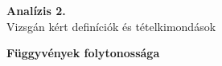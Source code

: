 \documentclass[a4paper,11pt]{article}
\begin{document}
\def\Z{\mathbb{Z}}
\def\R{\mathbb{R}}
\def\N{\mathbb{N}}
\def\Q{\mathbb{Q}}
\def\Ra{\overline{\mathbb{R}}}
\def\sume{\displaystyle\sum_{n=1}^{+\infty}}
\def\sumn{\displaystyle\sum_{n=0}^{+\infty}}
\def\sumun{\displaystyle\sum_{n=0}}
\def\limn{\displaystyle\lim_{n\to +\infty}}
\def\limh{\displaystyle\lim_{h\to0}}
\def\limxa{\displaystyle\lim_{x\to a}}
\def\limxatelj{\displaystyle\lim_{x\to a}\frac{f(x)-f(a)}{x-a}}
\def\rtr{\displaystyle\R\to\R}
\def\D{\mathcal{D}}
\def\lima{\displaystyle\lim_{a}}
\def\fda{f\in\D(a)}
\def\cab{\in C[a,b]}
\def\dab{\in\D(a,b)}
\def\limaj{\displaystyle\lim_{a+0}}
\def\Rv{\overline{\mathbb{R}}}
\def\fabr{f:(a,b)\to\R}
\def\prfv{primitív függvény}
\def\itr{I\to\R}
\def\fab{F[a,b]}
\def\kab{K[a,b]}
\def\rab{R[a,b]}
\def\te{\tau_1}
\def\tk{\tau_2}
\def\ftau{(f,\tau)}
\def\sumi{\sum\limits_{i=1}^{n}}
\def\intv{[x_{i-1},x_i]}
\def\intab{\int\limits_{a}^{b}}
\begin{center}
	{\LARGE\textbf{Analízis 2.}}\\[0.2cm]
	
	{\Large Vizsgán kért definíciók és tételkimondások}\\[0.5cm]	
\end{center}
\textbf{{\large Függyvények folytonossága}}
\end{document}
